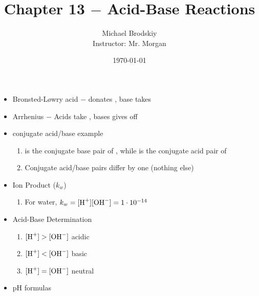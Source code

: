 \documentclass[12pt]{article}
\title{Chapter 13 $-$ Acid-Base Reactions}
\date{\today}
\author{Michael Brodskiy\\ \small Instructor: Mr. Morgan}
\begin{document}
\maketitle

\begin{itemize}

  \item Bronsted-L\o wry acid $-$ donates , base takes 

  \item Arrhenius $-$ Acids take , bases gives off 

  \item {} conjugate acid/base example

    \begin{enumerate}

      \item {} is the conjugate base pair of , while  is the conjugate acid pair of 

      \item Conjugate acid/base pairs differ by one  (nothing else)

    \end{enumerate}

  \item Ion Product ($k_w$)

    \begin{enumerate}

      \item For water, $k_w=[\ce{H+}][\ce{OH-}]=1\cdot10^{-14}$

    \end{enumerate}

  \item Acid-Base Determination

    \begin{enumerate}

      \item $[\ce{H+}] > [\ce{OH-}]$ acidic

      \item $[\ce{H+}] < [\ce{OH-}]$ basic

      \item $[\ce{H+}] = [\ce{OH-}]$ neutral

    \end{enumerate}

  \item pH formulas

    \begin{enumerate}


\end{enumerate}
\end{itemize}
\end{document}
